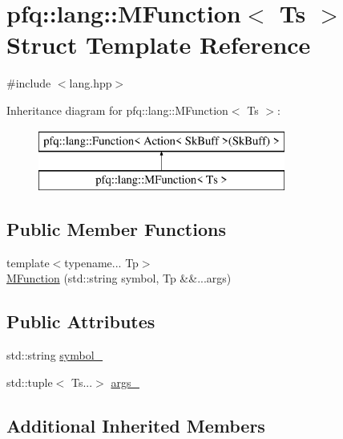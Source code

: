 \hypertarget{structpfq_1_1lang_1_1MFunction}{\section{pfq\+:\+:lang\+:\+:M\+Function$<$ Ts $>$ Struct Template Reference}
\label{structpfq_1_1lang_1_1MFunction}
}


{\ttfamily \#include $<$lang.\+hpp$>$}

Inheritance diagram for pfq\+:\+:lang\+:\+:M\+Function$<$ Ts $>$\+:\begin{figure}[H]
\begin{center}
\leavevmode
\includegraphics[height=2.000000cm]{structpfq_1_1lang_1_1MFunction}
\end{center}
\end{figure}
\subsection*{Public Member Functions}
\begin{DoxyCompactItemize}
\item 
{\footnotesize template$<$typename... Tp$>$ }\\\hyperlink{structpfq_1_1lang_1_1MFunction_a11626b481dd2a377eba5b472bffaec19}{M\+Function} (std\+::string symbol, Tp \&\&...args)
\end{DoxyCompactItemize}
\subsection*{Public Attributes}
\begin{DoxyCompactItemize}
\item 
std\+::string \hyperlink{structpfq_1_1lang_1_1MFunction_ad71e16a351d465079c8c4cc014157b2b}{symbol\+\_\+}
\item 
std\+::tuple$<$ Ts...$>$ \hyperlink{structpfq_1_1lang_1_1MFunction_a3259c7f79ac8c60bba3462bc01b859f7}{args\+\_\+}
\end{DoxyCompactItemize}
\subsection*{Additional Inherited Members}


